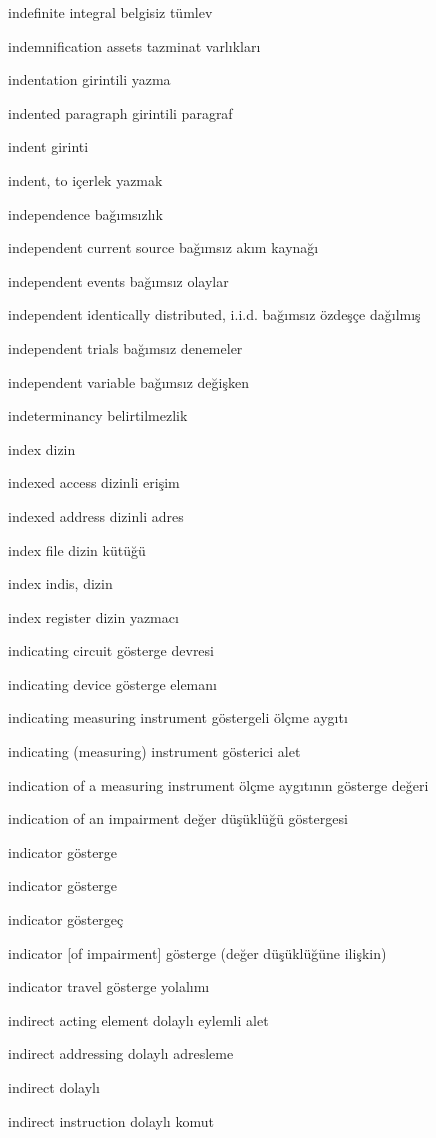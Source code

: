\documentclass[12pt,fleqn]{article}\usepackage{../../common}
\begin{document}
indefinite integral belgisiz tümlev

indemnification assets tazminat varlıkları

indentation girintili yazma

indented paragraph girintili paragraf

indent girinti

indent, to içerlek yazmak

independence bağımsızlık

independent current source bağımsız akım kaynağı

independent events bağımsız olaylar

independent identically distributed, i.i.d. bağımsız özdeşçe dağılmış

independent trials bağımsız denemeler

independent variable bağımsız değişken

indeterminancy belirtilmezlik

index dizin

indexed access dizinli erişim

indexed address dizinli adres

index file dizin kütüğü

index indis, dizin

index register dizin yazmacı

indicating circuit gösterge devresi

indicating device gösterge elemanı

indicating measuring instrument göstergeli ölçme aygıtı

indicating (measuring) instrument gösterici alet

indication of a measuring instrument ölçme aygıtının gösterge değeri

indication of an impairment değer düşüklüğü göstergesi

indicator gösterge

indicator gösterge

indicator göstergeç

indicator [of impairment] gösterge (değer düşüklüğüne ilişkin)

indicator travel gösterge yolalımı

indirect acting element dolaylı eylemli alet

indirect addressing dolaylı adresleme

indirect dolaylı

indirect instruction dolaylı komut
\end{document}
